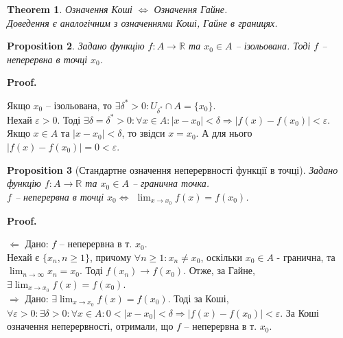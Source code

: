 \documentclass[a4paper, 14pt]{article}
\makeatletter
\def\qed{$\blacksquare$}
\def\rightproof{$\boxed{\Rightarrow}$ }
\def\leftproof{$\boxed{\Leftarrow}$ }
\theoremstyle{theoremdd}
\newtheorem{theorem}{Theorem}[subsection]
\theoremstyle{theoremdd}
\theoremstyle{theoremdd}
\theoremstyle{theoremdd}
\theoremstyle{theoremdd}
\newtheorem{proposition}[theorem]{Proposition}
\theoremstyle{theoremdd}
\theoremstyle{theoremdd}
\theoremstyle{theoremdd}
\renewenvironment{proof}[1][Proof.\\]{\par
\pushQED{\hfill \qed}%
\normalfont \topsep6\p@\@plus6\p@\relax
\trivlist
\item\relax
{\bfseries
#1\@addpunct{.}}\hspace\labelsep\ignorespaces
}{%
\popQED\endtrivlist\@endpefalse
}
\makeatother
\begin{document}
\begin{theorem}
Означення Коші $\iff$ Означення Гайне.\\
\textit{Доведення є аналогічним з означеннями Коші, Гайне в границях.}
\end{theorem}

\begin{proposition}
Задано функцію $f \colon A \to \mathbb{R}$ та $x_0 \in A$ -- ізольована. Тоді $f$ -- неперервна в точці $x_0$.
\end{proposition}

\begin{proof}
Якщо $x_0$ -- ізольована, то $\exists \delta^* > 0: U_{\delta^*} \cap A = \{x_0\}$.\\
Нехай $\varepsilon > 0$. Тоді $\exists \delta = \delta^* > 0: \forall x \in A: |x-x_0|< \delta \Rightarrow |f(x)-f(x_0)|<\varepsilon$.\\
Якщо $x \in A$ та $|x-x_0|< \delta$, то звідси $x=x_0$. А для нього $|f(x)-f(x_0)| = 0 < \varepsilon$.
\end{proof}

\begin{proposition}[Стандартне означення неперервності функції в точці]
Задано функцію $f \colon A \to \mathbb{R}$ та $x_0 \in A$ -- гранична точка.\\
$f$ -- неперервна в точці $x_0 \iff$ $\displaystyle\lim_{x \to x_0} f(x) = f(x_0)$.
\end{proposition}

\begin{proof}
\leftproof Дано: $f$ -- неперервна в т. $x_0$. \\
Нехай є $\{x_n, n \geq 1\}$, причому $\forall n \geq 1: x_n \neq x_0$, оскільки $x_0 \in A$ - гранична, та $\displaystyle\lim_{n \to \infty} x_n = x_0$. Тоді $f(x_n) \to f(x_0)$. Отже, за Гайне, $\exists \displaystyle\lim_{x \to x_0} f(x) = f(x_0)$.
\bigskip \\
\rightproof Дано: $\exists \displaystyle\lim_{x \to x_0} f(x) = f(x_0)$. Тоді за Коші,
$\forall \varepsilon > 0: \exists \delta > 0: \forall x \in A: 0 < |x-x_0| < \delta \Rightarrow |f(x)-f(x_0)| < \varepsilon$.
За Коші означення неперервності, отримали, що $f$ -- неперервна в т. $x_0$.
\end{proof}
\end{document}
